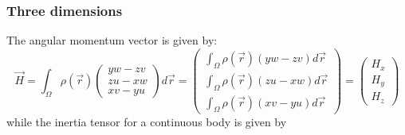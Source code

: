 

\subsubsection{Three dimensions}

The angular momentum vector is given by:
\begin{equation}
\vec H 
= \int_\Omega \rho(\vec r) \left( 
\begin{array}{c} 
yw-zv \\ zu-xw \\ xv-yu 
\end{array} \right) d\vec r
= 
\left(\begin{array}{c} 
\int_\Omega \rho(\vec r) (yw-zv) d\vec r\\
\int_\Omega \rho(\vec r) (zu-xw) d\vec r\\
\int_\Omega \rho(\vec r) (xv-yu) d\vec r
\end{array} \right)
= 
\left( 
\begin{array}{c} 
H_x \\ H_y \\ H_z
\end{array} \right)
\end{equation}
while the inertia tensor for a continuous body is given 
by
